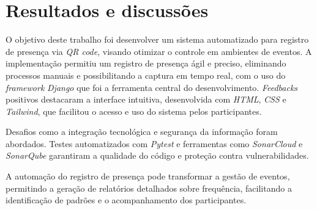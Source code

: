 \section{Resultados e discussões}
\label{sec:resultados_discussoes}

O objetivo deste trabalho foi desenvolver um sistema automatizado para registro de presença via \textit{QR code}, visando otimizar o controle em ambientes de eventos. A implementação permitiu um registro de presença ágil e preciso, eliminando processos manuais e possibilitando a captura em tempo real, com o uso do \textit{framework} \textit{Django} que foi a ferramenta central do desenvolvimento. \textit{Feedbacks} positivos destacaram a interface intuitiva, desenvolvida com \textit{HTML}, \textit{CSS} e \textit{Tailwind}, que facilitou o acesso e uso do sistema pelos participantes.

Desafios como a integração tecnológica e segurança da informação foram abordados. Testes automatizados com \textit{Pytest} e ferramentas como \textit{SonarCloud} e \textit{SonarQube} garantiram a qualidade do código e proteção contra vulnerabilidades.

A automação do registro de presença pode transformar a gestão de eventos, permitindo a geração de relatórios detalhados sobre frequência, facilitando a identificação de padrões e o acompanhamento dos participantes.

